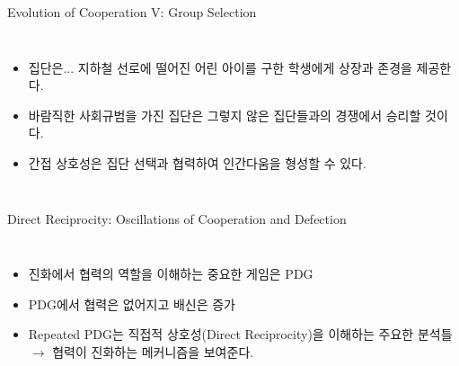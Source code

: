 \documentclass[final]{beamer}
\begin{document}
\begin{frame}[t]{Evolution of Cooperation V: Group Selection}
	\begin{columns}[c]
		\column{20em}
		\begin{itemize}
		\item 집단은... 지하철 선로에 떨어진 어린 아이를 구한 학생에게 상장과 존경을 제공한다.
		\item 바람직한 사회규범을 가진 집단은 그렇지 않은 집단들과의 경쟁에서 승리할 것이다.
		\item 간접 상호성은 집단 선택과 협력하여 인간다움을 형성할 수 있다.
		\end{itemize}
		\column{12em}
	\end{columns}
\end{frame}

\begin{frame}[t]{Direct Reciprocity: Oscillations of Cooperation and Defection}
	\begin{columns}[c]
	\column{15em}
	\begin{itemize}
		\item 진화에서 협력의 역할을 이해하는 중요한 게임은 PDG
		\item PDG에서 협력은 없어지고 배신은 증가 
		\item Repeated PDG는 직접적 상호성(Direct Reciprocity)을 이해하는 주요한 분석틀 $\rightarrow$ 협력이 진화하는 메커니즘을 보여준다. 
	\end{itemize}
	\column{15em}
	\end{columns}
\end{frame}
\end{document}
